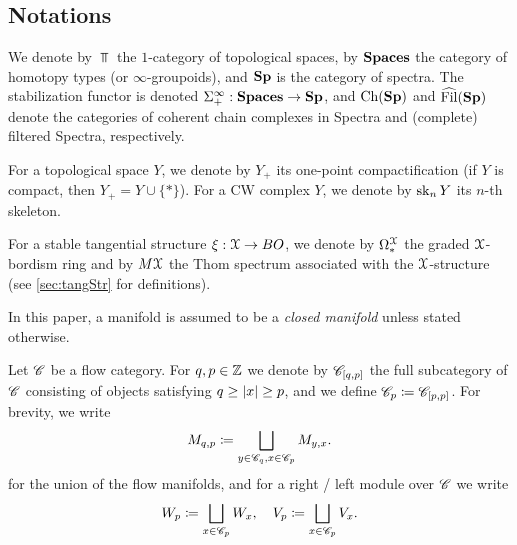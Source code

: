 \subsection*{Notations}
We denote by $\Top$ the $1$-category of topological spaces, by $\mathbf{Spaces}$ the category of homotopy types (or $\infty$-groupoids), and $\mathbf{Sp}$ is the category of spectra. The stabilization functor is denoted $\Sigma^{\infty}_+: \mathbf{Spaces} \to \mathbf{Sp}$, and $\operatorname{Ch}(\mathbf{Sp})$ and $\operatorname{\widehat{Fil}}(\mathbf{Sp})$ denote the categories of coherent chain complexes in Spectra and (complete) filtered Spectra, respectively.

For a topological space $Y$, we denote by $Y_+$ its one-point compactification (if $Y$ is compact, then $Y_+ = Y \cup \{*\}$).
For a CW complex $Y$, we denote by $\operatorname{sk}_n Y$ its $n$-th skeleton.

For a stable tangential structure $\xi: \EuScript{X} \to BO$, we denote by $\Omega^{\EuScript{X}}_*$ the graded $\EuScript{X}$-bordism ring and by $M\EuScript{X}$ the Thom spectrum associated with the $\EuScript{X}$-structure (see \cref{sec:tangStr} for definitions).

In this paper, a manifold is assumed to be a \emph{closed manifold} unless stated otherwise.

Let $\mathscr{C}$ be a flow category. For $q,p \in \mathbb{Z}$ we denote by $\mathscr{C}_{[q,p]}$ the full subcategory of $\mathscr{C}$ consisting of objects satisfying $q \ge \left\lvert x\right\rvert\ge p$, and we define $\mathscr{C}_p \coloneqq \mathscr{C}_{[p,p]}$. For brevity, we write 
\begin{equation*}
    M_{q,p}\coloneqq \bigsqcup_{y \in \mathscr{C}_q, x \in \mathscr{C}_p} M_{y,x}.
\end{equation*}
for the union of the flow manifolds, and for a right / left module over $\mathscr{C}$ we write
\begin{equation*}
    W_p \coloneqq \bigsqcup_{x \in \mathscr{C}_p} W_x, \quad V_p \coloneqq \bigsqcup_{x \in \mathscr{C}_p} V_x.
\end{equation*}

